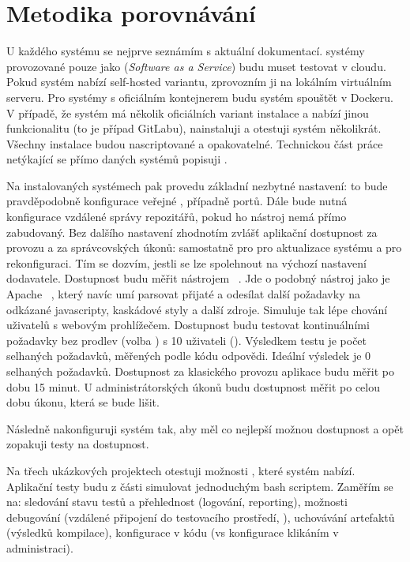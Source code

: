 \section{Metodika porovnávání}
    U každého systému se nejprve seznámím s aktuální dokumentací. \CICD systémy provozované pouze jako  (\textit{Software as a Service}) budu muset testovat v cloudu. Pokud systém nabízí self-hosted variantu, zprovozním ji na lokálním virtuálním serveru. Pro systémy s oficiálním kontejnerem budu systém spouštět v Dockeru. V případě, že systém má několik oficiálních variant instalace a nabízí jinou funkcionalitu (to je případ GitLabu), nainstaluji a otestuji systém několikrát. Všechny instalace budou nascriptované a opakovatelné. Technickou část práce netýkající se přímo daných \CICD systémů popisuji .

    Na instalovaných systémech pak provedu základní nezbytné nastavení: to bude pravděpodobně konfigurace veřejné , případně portů. Dále bude nutná konfigurace vzdálené správy repozitářů, pokud ho \CICD nástroj nemá přímo zabudovaný. Bez dalšího nastavení zhodnotím zvlášť aplikační dostupnost za provozu a za správcovských úkonů: samostatně pro pro aktualizace \CI systému a pro rekonfiguraci. Tím se dozvím, jestli se lze spolehnout na výchozí nastavení dodavatele. Dostupnost budu měřit nástrojem ~\cite{fulmer-siege}. Jde o podobný nástroj jako je Apache ~\cite{apache-ab}, který navíc umí parsovat přijaté  a odesílat další požadavky na odkázané javascripty, kaskádové styly a další zdroje. Simuluje tak lépe chování uživatelů s webovým prohlížečem. Dostupnost budu testovat kontinuálními požadavky bez prodlev (volba ) s 10 uživateli (). Výsledkem testu je počet selhaných požadavků, měřených podle \HTTP kódu odpovědi. Ideální výsledek je 0 selhaných požadavků. Dostupnost za klasického provozu aplikace budu měřit po dobu 15 minut. U administrátorských úkonů budu dostupnost měřit po celou dobu úkonu, která se bude lišit.

    Následně nakonfiguruji systém tak, aby měl co nejlepší možnou dostupnost a opět zopakuji testy na dostupnost.

    Na třech ukázkových projektech otestuji možnosti \CI, které systém nabízí. Aplikační testy budu z části simulovat jednoduchým bash scriptem.  Zaměřím se na: sledování stavu testů a přehlednost (logování, reporting), možnosti debugování (vzdálené připojení do testovacího prostředí, ), uchovávání artefaktů (výsledků kompilace), konfigurace v kódu (vs konfigurace klikáním v administraci).

